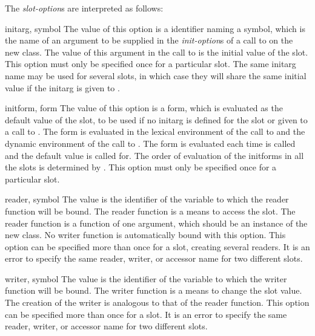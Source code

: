 \begin{optDefinition}
\noindent
The {\em slot-option}\/s are interpreted as follows:
\begin{options}
    \item[initarg, symbol]%
    The value of this option is a identifier naming a symbol, which is the name
    of an argument to be supplied in the {\em init-option\/}s of a call to
     on the new class.  The value of this argument in the call
    to  is the initial value of the slot.  This option must
    only be specified once for a particular slot.  The same initarg name may be
    used for several slots, in which case they will share the same initial value
    if the initarg is given to .

    \item[initform, form]%
    The value of this option is a form, which is evaluated as the default value
    of the slot, to be used if no initarg is defined for the slot or given to a
    call to .  The form is evaluated in the lexical
    environment of the call to  and the dynamic environment
    of the call to .  The form is evaluated each time
     is called and the default value is called for.  The order
    of evaluation of the initforms in all the slots is determined by
    .  This option must only be specified once for a
    particular slot.

    \item[reader, symbol]%
    The value is the identifier of the variable to which the reader function
    will be bound.  The reader function is a means to access the slot.  The
    reader function is a function of one argument, which should be an instance
    of the new class.  No writer function is automatically bound with this
    option.  This option can be specified more than once for a slot, creating
    several readers.  It is an error to specify the same reader, writer, or
    accessor name for two different slots.

    \item[writer, symbol]%
    The value is the identifier of the variable to which the writer function
    will be bound.  The writer function is a means to change the slot value.
    The creation of the writer is analogous to that of the reader function.
    This option can be specified more than once for a slot.  It is an error to
    specify the same reader, writer, or accessor name for two different slots.


\end{options}
\end{optDefinition}

